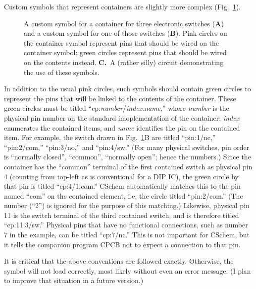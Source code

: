 \documentclass[11pt]{report}
\begin{document}
Custom symbols that represent containers are slightly more complex (Fig.~\ref{fig.cont}). 
%
\begin{figure}[h]
  \mbox{}\hfill
  \hfill
     \hfill\mbox{}

   \mbox{}\hfill
        \hfill\mbox{}

  \caption{A custom symbol for a container for three electronic
    switches ({\bf A}) and a custom symbol for one of those switches
    ({\bf B}). Pink
    circles on the container symbol represent pins that should be wired on the
    container symbol; green circles represent pins that should be
    wired on the contents instead. {\bf C.}~A (rather silly) circuit
    demonstrating the use of these symbols.}\label{fig.cont}
\end{figure}
%
In addition to the usual pink circles, such symbols should contain
green circles to represent the pins that will be linked to the
contents of the container. These green circles must be titled
``cp:\emph{number}/\emph{index}.\emph{name},'' where \emph{number} is
the physical pin number on the standard imoplementation of the
container; \emph{index} enumerates the contained items, and
\emph{name} identifies the pin on the contained item. For example, the
switch drawn in Fig.~\ref{fig.cont}B are titled ``pin:1/nc,''
``pin:2/com,'' ``pin:3/no,'' and ``pin:4/sw.'' (For many physical
switches, pin order is ``normally closed'', ``common'', ``normally
open''; hence the numbers.) Since the container has the ``common''
terminal of the first contained switch as physical pin 4 (counting
from top-left as is conventional for a DIP IC), the green circle by
that pin is titled ``cp:4/1.com.''  CSchem automatically matches this
to the pin named ``com'' on the contained element, i.e, the circle
titled ``pin:2/com.'' (The number (``2'') is ignored for the purpose
of this matching.)  Likewise, physical pin 11 is the switch terminal
of the third contained switch, and is therefore titled ``cp:11:3/sw.''
Physical pins that have no functional connections, such as number 7 in
the example, can be titled ``cp:7/nc.'' This is not important for
CSchem, but it tells the companion program CPCB not to expect a
connection to that pin.

It is critical that the above conventions are followed
exactly. Otherwise, the symbol will not load correctly, most likely
without even an error message. (I plan to improve that situation in a
future version.)  
\end{document}
